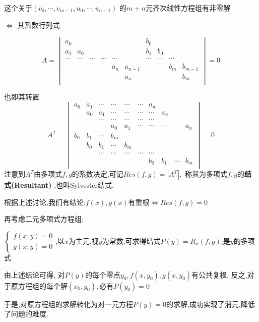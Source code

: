 	这个关于$(v_0,\cdots,v_{m-1},u_0,\cdots,u_{n-1})$ 的$ m+n$元齐次线性方程组有非零解
	
	$ \Leftrightarrow $ 其系数行列式
	
	\[ A=\begin{vmatrix} 
		a_0	&	&	&	&	 &		& b_0 &		&	 &	\\
		a_1	&a_0&	&	&			&	& b_1 & b_0	&	&	\\
  \cdots &\cdots &\cdots &\cdots	&  \cdots&	& \cdots &\cdots	&	\cdots	&	\\
		 &	&	&	&a_n &a_{n-1}   &		&	& b_m  & b_{m-1} \\
		 &	&	&	&	 &a_n		&		&	&	  & b_m\\
	\end{vmatrix} = 0\]

	也即其转置
	\[A^{T}= \begin{vmatrix}
	a_0 & a_1 & \cdots & \cdots & \cdots & \cdots & a_n		&		&	&   \\
		& a_0 & a_1	   & \cdots & \cdots & \cdots & \cdots  &a_n   &	&	\\
		&	  & \cdots & \cdots & \cdots & \cdots & \cdots &		&	&	\\
		&	  &		   & a_0	& a_1	 & \cdots & \cdots & \cdots &	& a_n\\
	b_0 & b_1 & \cdots & b_m	&		 &		  &		   &		&	&   \\
		& b_0 & b_1	   & \cdots  &b_m   &	    	&		&		&	&	\\
		&	  & \cdots & \cdots & \cdots & \cdots & \cdots &		&	&	\\
		&	  &		   &		&		&		& b_0		& b_1	& \cdots & b_m\\
	\end{vmatrix} =0\]
	注意到$ A^{T}$由多项式$ f,g$的系数决定,可记$ Res(f,g)=|A^{T}|,$
	称其为多项式$ f,g$的{\bf 结式(Resultant) },也叫Sylvester结式.

	根据上述讨论,我们有结论:$ f(x),g(x)$有重根$ \Leftrightarrow Res(f,g) = 0$

	再考虑二元多项式方程组:

	$ \begin{cases}
		f(x,y)=0 \\g(x,y)=0 
	\end{cases}$,以$ x$为主元,视$ y$为常数,可求得结式$ P(y) = R_x(f,g)$,是$ y$的多项式

	由上述结论可得,
	对$ P(y)$的每个零点$ y_0,f(x,y_0),g(x,y_0)$有公共复根.
	反之,对于原方程组的每个解$ (x_0,y_0), $必有$ P(y_0) = 0$

	于是,对原方程组的求解转化为对一元方程$ P(y) = 0$的求解,成功实现了消元,降低了问题的难度.


